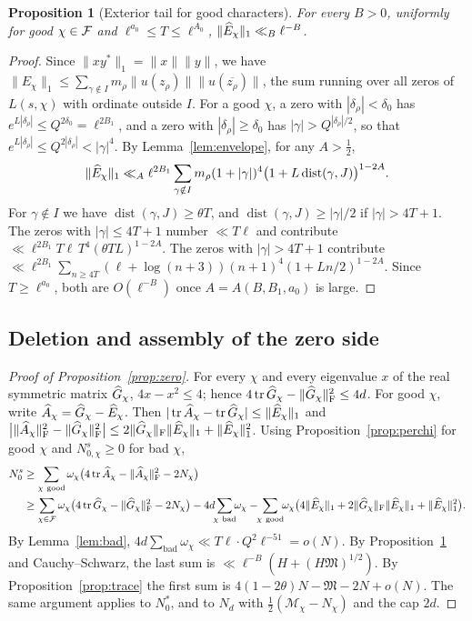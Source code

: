 \documentclass[11pt]{amsart}
\newtheorem{proposition}[theorem]{Proposition}
\theoremstyle{definition}
\theoremstyle{remark}
\numberwithin{equation}{section}
\begin{document}
\begin{proposition}[Exterior tail for good characters]\label{prop:tail}
For every $B>0$, uniformly for good $\chi\in\mathcal F$ and $\ell^{a_0}\le T\le\ell^{A_0}$, $\|\widehat E_\chi\|_1\ll_B\ell^{-B}$.
\end{proposition}
\begin{proof}
Since $\|xy^*\|_1=\|x\|\|y\|$, we have $\|E_\chi\|_1\le\sum_{\gamma\notin I}m_\rho\|u(z_\rho)\|\|u(\overline{z_\rho})\|$, the sum running over all zeros of $L(s,\chi)$ with ordinate outside $I$. For a good $\chi$, a zero with $|\delta_\rho|<\delta_0$ has $e^{L|\delta_\rho|}\le Q^{2\delta_0}=\ell^{2B_1}$, and a zero with $|\delta_\rho|\ge\delta_0$ has $|\gamma|>Q^{|\delta_\rho|/2}$, so that $e^{L|\delta_\rho|}\le Q^{2|\delta_\rho|}<|\gamma|^4$. By Lemma~\ref{lem:envelope}, for any $A>\frac12$,
\[
\|\widehat E_\chi\|_1\ll_A\ell^{2B_1}\sum_{\gamma\notin I}m_\rho(1+|\gamma|)^4\big(1+L\operatorname{dist}(\gamma,J)\big)^{1-2A}.
\]
For $\gamma\notin I$ we have $\operatorname{dist}(\gamma,J)\ge\theta T$, and $\operatorname{dist}(\gamma,J)\ge|\gamma|/2$ if $|\gamma|>4T+1$. The zeros with $|\gamma|\le4T+1$ number $\ll T\ell$ and contribute $\ll\ell^{2B_1}T\ell\,T^4(\theta TL)^{1-2A}$. The zeros with $|\gamma|>4T+1$ contribute $\ll\ell^{2B_1}\sum_{n\ge4T}(\ell+\log(n+3))(n+1)^4(1+Ln/2)^{1-2A}$. Since $T\ge\ell^{a_0}$, both are $O(\ell^{-B})$ once $A=A(B,B_1,a_0)$ is large.
\end{proof}

\subsection{Deletion and assembly of the zero side}
\begin{proof}[Proof of Proposition~\ref{prop:zero}]
For every $\chi$ and every eigenvalue $x$ of the real symmetric matrix $\widehat G_\chi$, $4x-x^2\le4$; hence $4\operatorname{tr}\widehat G_\chi-\|\widehat G_\chi\|_\mathrm F^2\le4d$. For good $\chi$, write $\widehat A_\chi=\widehat G_\chi-\widehat E_\chi$. Then $|\operatorname{tr}\widehat A_\chi-\operatorname{tr}\widehat G_\chi|\le\|\widehat E_\chi\|_1$ and
$\big|\|\widehat A_\chi\|_\mathrm F^2-\|\widehat G_\chi\|_\mathrm F^2\big|\le2\|\widehat G_\chi\|_\mathrm F\|\widehat E_\chi\|_1+\|\widehat E_\chi\|_1^2$.
Using Proposition~\ref{prop:perchi} for good $\chi$ and $N^s_{0,\chi}\ge0$ for bad $\chi$,
\begin{align*}
N^s_0&\ge\sum_{\chi\ \mathrm{good}}\omega_\chi\big(4\tr\hA_\chi-\|\hA_\chi\|_\Fro^2-2N_\chi\big)\\
&\ge\sum_{\chi\in\cF}\omega_\chi\big(4\tr\hG_\chi-\|\hG_\chi\|_\Fro^2-2N_\chi\big)-4d\!\!\sum_{\chi\ \mathrm{bad}}\!\!\omega_\chi-\!\!\sum_{\chi\ \mathrm{good}}\!\!\omega_\chi\big(4\|\hE_\chi\|_1+2\|\hG_\chi\|_\Fro\|\hE_\chi\|_1+\|\hE_\chi\|_1^2\big).
\end{align*}
By Lemma~\ref{lem:bad}, $4d\sum_{\mathrm{bad}}\omega_\chi\ll T\ell\cdot Q^2\ell^{-51}=o(N)$. By Proposition~\ref{prop:tail} and Cauchy--Schwarz, the last sum is $\ll\ell^{-B}(H+(H\mathfrak M)^{1/2})$. By Proposition~\ref{prop:trace} the first sum is $4(1-2\theta)N-\mathfrak M-2N+o(N)$. The same argument applies to $N^*_0$, and to $N_d$ with $\frac12(\mathcal M_\chi-N_\chi)$ and the cap $2d$.
\end{proof}
\end{document}
